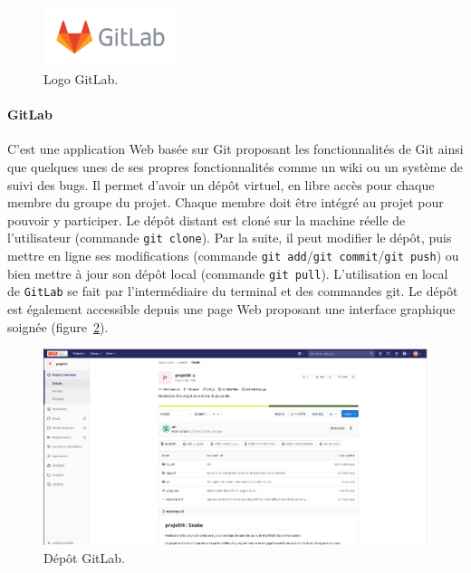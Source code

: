        \begin{figure}[!ht]
        
            \centering 
            \includegraphics[width=0.35\textwidth]{images/gitlab-logo.png} 
            \caption{Logo GitLab.}
            \label{logo_GitLab}
            
        \end{figure}
        
        \clearpage
        
        \paragraph{GitLab}
            C'est une application Web basée sur Git proposant les fonctionnalités de Git ainsi que quelques unes de ses propres fonctionnalités comme un wiki ou un système de suivi des bugs. Il permet d'avoir un dépôt virtuel, en libre accès pour chaque membre du groupe du projet. Chaque membre doit être intégré au projet pour pouvoir y participer. Le dépôt distant est cloné sur la machine réelle de l'utilisateur (commande \verb|git clone|). Par la suite, il peut modifier le dépôt, puis mettre en ligne ses modifications (commande \verb|git add|/\verb|git commit|/\verb|git push|) ou bien mettre à jour son dépôt local (commande \verb|git pull|). L'utilisation en local de \verb|GitLab| se fait par l'intermédiaire du terminal et des commandes git. Le dépôt est également accessible depuis une page Web proposant une interface graphique soignée (figure~\ref{Dépôt_GitLab}). 
        
        \vspace{1 cm}
        
        \begin{figure}[!ht]
        
            \centering 
            \includegraphics[width=1\textwidth]{images/depot_GitLab.png} 
            \caption{Dépôt GitLab.}
            \label{Dépôt_GitLab}
            
        \end{figure}
        
